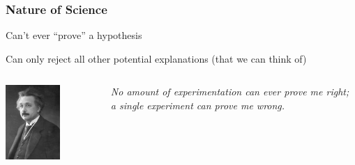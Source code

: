 \documentclass[10pt]{beamer}
\begin{document}
\begin{frame}[t]
\frametitle{Nature of Science}
\vspace{0.5cm}

	Can't ever ``prove'' a hypothesis\\
	
	\vspace{0.25cm}
	
	Can only reject all other potential explanations (that we can think of)
	
	\vspace{0.5cm}
	
	\begin{columns}
		\begin{column}{0.3\textwidth}
			\begin{center}
				\includegraphics[width=0.6\textwidth]{figures/einstein.jpg}
			\end{center}
		\end{column}
		
		\begin{column}{0.7\textwidth}
			\emph{\textcolor{myblue}{No amount of experimentation can ever prove me right; a single experiment can prove me wrong.}}
		\end{column}
	\end{columns}
\end{frame}
\end{document}
